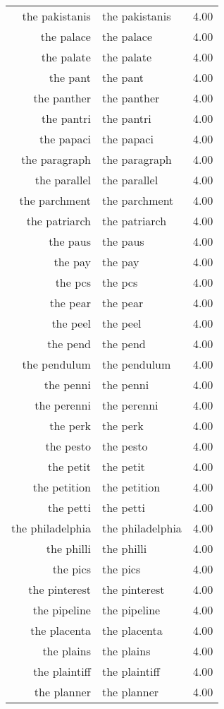 \begin{table}[ht]
\begin{tabular}{rlr}
  the pakistanis & the pakistanis & 4.00 \\ 
  the palace & the palace & 4.00 \\ 
  the palate & the palate & 4.00 \\ 
  the pant & the pant & 4.00 \\ 
  the panther & the panther & 4.00 \\ 
  the pantri & the pantri & 4.00 \\ 
  the papaci & the papaci & 4.00 \\ 
  the paragraph & the paragraph & 4.00 \\ 
  the parallel & the parallel & 4.00 \\ 
  the parchment & the parchment & 4.00 \\ 
  the patriarch & the patriarch & 4.00 \\ 
  the paus & the paus & 4.00 \\ 
  the pay & the pay & 4.00 \\ 
  the pcs & the pcs & 4.00 \\ 
  the pear & the pear & 4.00 \\ 
  the peel & the peel & 4.00 \\ 
  the pend & the pend & 4.00 \\ 
  the pendulum & the pendulum & 4.00 \\ 
  the penni & the penni & 4.00 \\ 
  the perenni & the perenni & 4.00 \\ 
  the perk & the perk & 4.00 \\ 
  the pesto & the pesto & 4.00 \\ 
  the petit & the petit & 4.00 \\ 
  the petition & the petition & 4.00 \\ 
  the petti & the petti & 4.00 \\ 
  the philadelphia & the philadelphia & 4.00 \\ 
  the philli & the philli & 4.00 \\ 
  the pics & the pics & 4.00 \\ 
  the pinterest & the pinterest & 4.00 \\ 
  the pipeline & the pipeline & 4.00 \\ 
  the placenta & the placenta & 4.00 \\ 
  the plains & the plains & 4.00 \\ 
  the plaintiff & the plaintiff & 4.00 \\ 
  the planner & the planner & 4.00 \\ 

\end{tabular}
\end{table}
